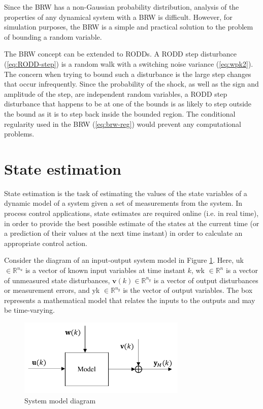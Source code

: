 Since the \gls{BRW} has a non-Gaussian probability distribution, analysis of the properties of any dynamical system with a \gls{BRW} is difficult. However, for simulation purposes, the \gls{BRW} is a simple and practical solution to the problem of bounding a random variable.

The \gls{BRW} concept can be extended to \gls{RODD}s. A \gls{RODD} step disturbance (\ref{eq:RODD-step}) is a random walk with a switching noise variance (\ref{eq:wpk2}). The concern when trying to bound such a disturbance is the large step changes that occur infrequently. Since the probability of the shock, as well as the sign and amplitude of the step, are independent random variables, a \gls{RODD} step disturbance that happens to be at one of the bounds is as likely to step outside the bound as it is to step back inside the bounded region. The conditional regularity used in the \gls{BRW} (\ref{eq:brw-reg}) would prevent any computational problems. 



\section{State estimation}

State estimation is the task of estimating the values of the state variables of a dynamic model of a system given a set of measurements from the system. In process control applications, state estimates are required online (i.e. in real time), in order to provide the best possible estimate of the states at the current time (or a prediction of their values at the next time instant) in order to calculate an appropriate control action.

Consider the diagram of an input-output system model in Figure \ref{fig:model_diag_uwvy}. Here, \gls{uk} $\in \mathbb{R}^{n_u}$ is a vector of known input variables at time instant $k$, \gls{wk} $\in \mathbb{R}^n$ is a vector of unmeasured state disturbances, $\mathbf{v}(k) \in \mathbb{R}^{n_y}$ is a vector of output disturbances or measurement errors, and \gls{yk} $\in \mathbb{R}^{n_y}$ is the vector of output variables. The box represents a mathematical model that relates the inputs to the outputs and may be time-varying. 
\begin{figure}[htp]
	\centering {}
	\includegraphics[width=8cm]{images/model_diag_uwvy.pdf}
	\caption{System model diagram}
	\label{fig:model_diag_uwvy}
\end{figure}

